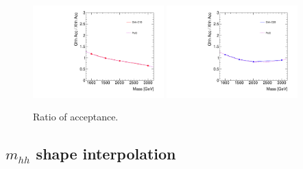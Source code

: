 \begin{figure}[!h]
\begin{center}
\includegraphics*[width=0.45\textwidth]{./figures/boosted/SigInterpolation/AcceptanceRatio_C10_Fit.pdf}
\includegraphics*[width=0.45\textwidth]{./figures/boosted/SigInterpolation/AcceptanceRatio_C20_Fit.pdf}
\caption{Ratio of acceptance.}
\label{fig:boosted_siginter_acceptanceratio}
\end{center}
\end{figure}
\FloatBarrier


\subsection{$m_{hh}$ shape interpolation}
\label{app:boosted_siginter_shape}

